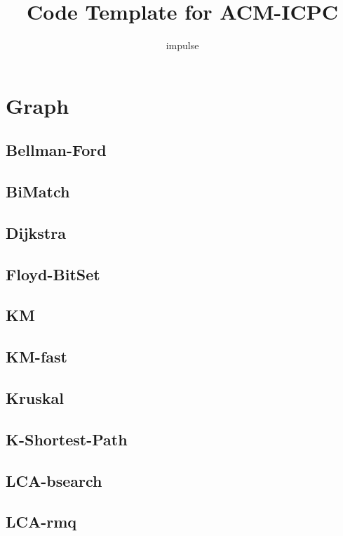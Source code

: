 \documentclass{article}
\title{Code Template for ACM-ICPC}
\author{impulse}
\begin{document}
\begin{titlepage}
\maketitle
\thispagestyle{empty}
\pagebreak
\pagestyle{plain}
\tableofcontents
\end{titlepage}
\section{Graph}
\subsection{Bellman-Ford}

\subsection{BiMatch}

\subsection{Dijkstra}

\subsection{Floyd-BitSet}

\subsection{KM}

\subsection{KM-fast}

\subsection{Kruskal}

\subsection{K-Shortest-Path}

\subsection{LCA-bsearch}

\subsection{LCA-rmq}

\end{document}
